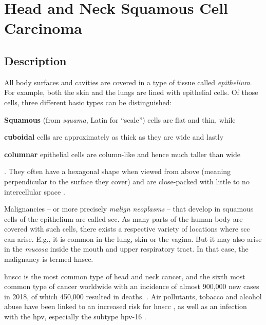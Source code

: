 \documentclass[\relativeRoot/main.tex]{subfiles}
\begin{document}
\section{Head and Neck Squamous Cell Carcinoma}
\label{sec:intro:hnscc}

\subsection*{Description}
\label{subsec:intro:hnscc:description}

All body surfaces and cavities are covered in a type of tissue called \emph{epithelium}. For example, both the skin and the lungs are lined with epithelial cells. Of those cells, three different basic types can be distinguished:
\begin{enumerate*}[label={(\arabic*)}]
    \item \textbf{Squamous} (from \emph{squama}, Latin for ``scale'') cells are flat and thin, while 
    \item \textbf{cuboidal} cells are approximately as thick as they are wide and lastly
    \item \textbf{columnar} epithelial cells are column-like and hence much taller than wide
\end{enumerate*}.
They often have a hexagonal shape when viewed from above (meaning perpendicular to the surface they cover) and are close-packed with little to no intercellular space \cite{marieb_human_1995}.

Malignancies -- or more precisely \emph{malign neoplasms} -- that develop in squamous cells of the epithelium are called \gls{scc}. As many parts of the human body are covered with such cells, there exists a respective variety of locations where \gls{scc} can arise. E.g., it is common in the lung, skin or the vagina. But it may also arise in the \emph{mucosa} inside the mouth and upper respiratory tract. In that case, the malignancy is termed \gls{hnscc}.

\gls{hnscc} is the most common type of head and neck cancer, and the sixth most common type of cancer worldwide with an incidence of almost 900,000 new cases in 2018, of which 450,000 resulted in deaths. \cite{johnson_head_2020,ferlay_estimating_2019,bray_global_2018}. Air pollutants, tobacco and alcohol abuse have been linked to an increased risk for \gls{hnscc} \cite{johnson_head_2020,wong_cancers_2014}, as well as an infection with the \gls{hpv}, especially the subtype \gls{hpv}-16 \cite{hennessey_human_2009}.
\end{document}
